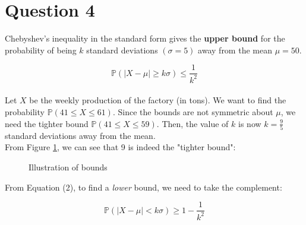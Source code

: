 \documentclass[12pt]{article}
\begin{document}
\newpage

\section*{Question 4}
Chebyshev's inequality in the standard form gives the \textbf{upper bound} for the probability of being $k$ standard deviations $(\sigma = 5)$ away from the mean $\mu = 50$. 

\begin{equation}
    \mathbb{P}(|X - \mu| \geq k\sigma) \leq \frac{1}{k^{2}}
\end{equation} \\ 

\noindent Let $X$ be the weekly production of the factory (in tons). We want to find the probability $ \mathbb{P}(41 \leq X \leq 61)$. Since the bounds are not symmetric about $\mu$, we need the tighter bound $ \mathbb{P}(41 \leq X \leq 59)$. Then, the value of $k$ is now $k = \frac{9}{5}$ standard deviations away from the mean. \\ 

\noindent From Figure \ref{fig:4-ineq}, we can see that 9 is indeed the "tighter bound": \\

\begin{figure}[H]
    \centering
    \caption{Illustration of bounds}
    \label{fig:4-ineq}
\end{figure}

\noindent From Equation (2), to find a \textit{lower} bound, we need to take the complement:

\begin{equation}
    \mathbb{P}(|X - \mu| < k\sigma) \geq 1 - \frac{1}{k^{2}}
\end{equation} \\ 
\end{document}

